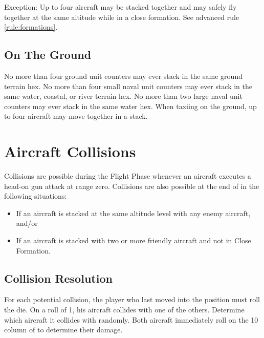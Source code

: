 Exception: Up to four aircraft may be stacked together and may safely fly together at the same altitude while in a close formation. See advanced rule \ref{rule:formations}.

\subsection{On The Ground}
No more than four ground unit counters may ever stack in the same ground terrain hex. No more than four small naval unit counters may ever stack in the same water, coastal, or river terrain hex. No more than two large naval unit counters may ever stack in the same water hex. When taxiing on the ground, up to four aircraft may move together in a stack.

\section{Aircraft Collisions}
\label{rule:aircraft-collisions}

Collisions are possible during the Flight Phase whenever an aircraft executes a head-on gun attack at range zero. Collisions are also possible at the end of  in the following situations:

\begin{itemize}
    \item
        If an aircraft is stacked at the same altitude level with any enemy aircraft, and/or
    \item
        If an aircraft is stacked with two or more friendly aircraft and not in Close Formation.
\end{itemize}

\subsection{Collision Resolution}
 For each potential collision, the player who last moved into the position must roll the die. On a roll of 1, his aircraft collides with one of the others. Determine which aircraft it collides with randomly. Both aircraft immediately roll on the 10 column of  to determine their damage.

